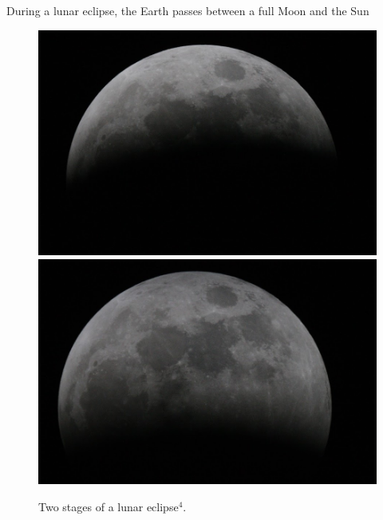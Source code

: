 \documentclass[12pt]{beamer}
\begin{document}
        \begin{frame} \centering
            During a lunar eclipse, the Earth passes between a full Moon and the Sun
            \begin{figure}
                \includegraphics[scale=0.15, fbox]{lunar2.JPG}
                \includegraphics[scale=0.15, fbox]{lunar1.JPG}
                \caption{Two stages of a lunar eclipse$^4$.}
            \end{figure}
        \end{frame}
\end{document}
